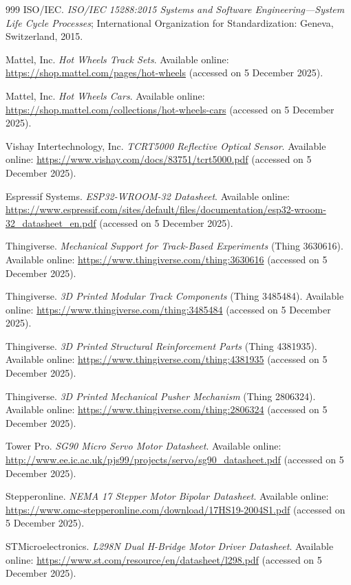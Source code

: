 \documentclass[sensors,article,submit,pdftex]{Definitions/mdpi}
\begin{document}
\begin{thebibliography}{999}
ISO/IEC.
\textit{ISO/IEC 15288:2015 Systems and Software Engineering---System Life Cycle Processes};
International Organization for Standardization: Geneva, Switzerland, 2015.

Mattel, Inc.
\textit{Hot Wheels Track Sets}.
Available online: \url{https://shop.mattel.com/pages/hot-wheels} (accessed on 5 December 2025).

Mattel, Inc.
\textit{Hot Wheels Cars}.
Available online: \url{https://shop.mattel.com/collections/hot-wheels-cars} (accessed on 5 December 2025).

Vishay Intertechnology, Inc.
\textit{TCRT5000 Reflective Optical Sensor}.
Available online: \url{https://www.vishay.com/docs/83751/tcrt5000.pdf} (accessed on 5 December 2025).

Espressif Systems.
\textit{ESP32-WROOM-32 Datasheet}.
Available online: \url{https://www.espressif.com/sites/default/files/documentation/esp32-wroom-32_datasheet_en.pdf} (accessed on 5 December 2025).

Thingiverse.
\textit{Mechanical Support for Track-Based Experiments} (Thing 3630616).
Available online: \url{https://www.thingiverse.com/thing:3630616} (accessed on 5 December 2025).

Thingiverse.
\textit{3D Printed Modular Track Components} (Thing 3485484).
Available online: \url{https://www.thingiverse.com/thing:3485484} (accessed on 5 December 2025).

Thingiverse.
\textit{3D Printed Structural Reinforcement Parts} (Thing 4381935).
Available online: \url{https://www.thingiverse.com/thing:4381935} (accessed on 5 December 2025).

Thingiverse.
\textit{3D Printed Mechanical Pusher Mechanism} (Thing 2806324).
Available online: \url{https://www.thingiverse.com/thing:2806324} (accessed on 5 December 2025).

Tower Pro.
\textit{SG90 Micro Servo Motor Datasheet}.
Available online: \url{http://www.ee.ic.ac.uk/pjs99/projects/servo/sg90_datasheet.pdf} (accessed on 5 December 2025).

Stepperonline.
\textit{NEMA 17 Stepper Motor Bipolar Datasheet}.
Available online: \url{https://www.omc-stepperonline.com/download/17HS19-2004S1.pdf} (accessed on 5 December 2025).

STMicroelectronics.
\textit{L298N Dual H-Bridge Motor Driver Datasheet}.
Available online: \url{https://www.st.com/resource/en/datasheet/l298.pdf} (accessed on 5 December 2025).


\end{thebibliography}
\end{document}
